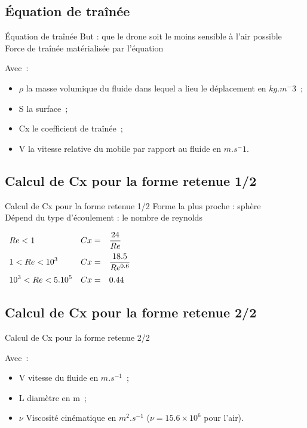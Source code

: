 \documentclass{beamer}
\begin{document}
\subsection{Équation de traînée}
\begin{frame}{Équation de traînée}
 But : que le drone soit le moins sensible à l'air possible \\
 Force de traînée matérialisée par l'équation \\
 \begin{center}
 \end{center}
 Avec~:
 \begin{itemize}
  \item $\rho$ la masse volumique du fluide dans lequel a lieu le déplacement en $kg.m^-3$~;
  \item S la surface~;
  \item Cx le coefficient de traînée~;
  \item V la vitesse relative du mobile par rapport au fluide en $m.s^-1$.
 \end{itemize} 
\end{frame}

\subsection{Calcul de Cx pour la forme retenue 1/2}
\begin{frame}{Calcul de Cx pour la forme retenue 1/2}
 Forme la plus proche : sphère \\
 Dépend du type d'écoulement : le nombre de reynolds \\
 \begin{center}
  $\begin{array}{>{\displaystyle}l>{\displaystyle}l>{\displaystyle}l}
   Re < 1 & Cx = & \frac{24}{Re} \medbreak \\
   1 < Re < 10^3 & Cx = & \frac{18.5}{Re^{0.6}} \medbreak \\
   10^3 < Re < 5.10^5 & Cx = & 0.44
  \end{array}$
 \end{center}
\end{frame}

\subsection{Calcul de Cx pour la forme retenue 2/2}
\begin{frame}{Calcul de Cx pour la forme retenue 2/2}
 \begin{center}
 \end{center}
 Avec~: \\
 \begin{itemize}
  \item V vitesse du fluide en $m.s^{-1}$~;
  \item L diamètre en m~;
  \item $\nu$ Viscosité cinématique en $m^2.s^{-1}$ ($\nu = 15.6 \times 10^6$ pour l'air).
 \end{itemize} 
\end{frame}
\end{document}
